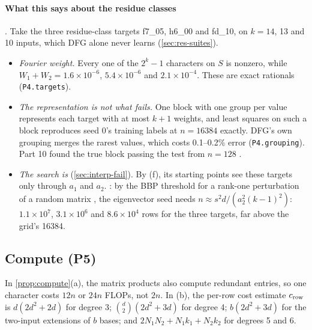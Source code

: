 \paragraph{What this says about the residue classes} . Take the three residue-class targets f7\_05, h6\_00 and fd\_10, on $k=14$, 13 and 10 inputs, which DFG alone never learns (\cref{sec:res-suites}).
\begin{itemize}
\item \emph{Fourier weight.} Every one of the $2^k-1$ characters on $S$ is nonzero, while $W_1+W_2=1.6\times10^{-6}$, $5.4\times10^{-6}$ and $2.1\times10^{-4}$. These are exact rationals (\texttt{P4.targets}).
\item \emph{The representation is not what fails.} One block with one group per value represents each target with at most $k+1$ weights, and least squares on such a block reproduces seed 0's training labels at $n=16384$ exactly. DFG's own grouping merges the rarest values, which costs 0.1--0.2\% error (\texttt{P4.grouping}). Part 10 found the true block passing the test from $n=128$ \cite{portfoliolearner2026}.
\item \emph{The search is} (\cref{sec:interp-fail}). By (f), its starting points see these targets only through $a_1$ and $a_2$. : by the BBP threshold for a rank-one perturbation of a random matrix \cite{baik2005phase,benaychgeorges2011eigenvalues}, the eigenvector seed needs $n\approx s^2d/(a_2^2(k-1)^2)$: $1.1\times10^7$, $3.1\times10^6$ and $8.6\times10^4$ rows for the three targets, far above the grid's 16384.
\end{itemize}

\subsection{Compute (P5)}\label{app:proof-compute}

In \cref{prop:compute}(a), the matrix products also compute redundant entries, so one character costs $12n$ or $24n$ FLOPs, not $2n$. In (b), the per-row cost estimate $c_{\rm row}$ is $d(2d^2+2d)$ for degree 3; $\binom d2(2d^2+3d)$ for degree 4; $b(2d^2+3d)$ for the two-input extensions of $b$ bases; and $2N_1N_2+N_1k_1+N_2k_2$ for degrees 5 and 6.

